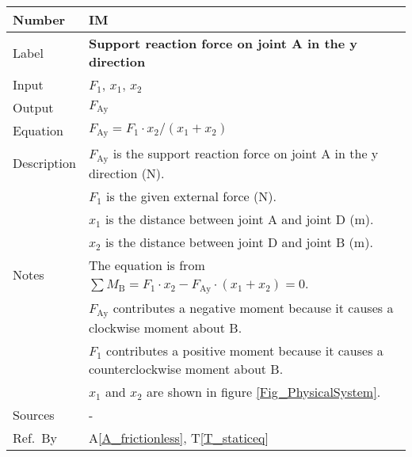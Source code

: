 \documentclass[12pt]{article}
\newcommand{\colAwidth}{0.13\textwidth}
\newcommand{\colBwidth}{0.82\textwidth}
\newcommand{\tref}[1]{T\ref{#1}}
\newcommand{\aref}[1]{A\ref{#1}}
\newcounter{instnum} %
\begin{document}
\noindent
\begin{minipage}{\textwidth}
	\renewcommand*{\arraystretch}{1.5}
	\begin{tabular}{| p{\colAwidth} | p{\colBwidth}|}
		\hline
		\rowcolor[gray]{0.9}
		Number& IM{instnum}\theinstnum \label{I_solveFay}\\
		\hline
		Label& \bf Support reaction force on joint A in the y direction\\
		\hline
		Input& $F_\text{1}$, $x_\text{1}$, $x_\text{2}$ \\
		\hline
		Output& $F_{\text{{Ay}}}$ \\
		\hline
		Equation& $F_{\text{Ay}} = F_\text{1} \cdot x_\text{2} / (x_\text{1} + 
		x_\text{2})$ \\
		\hline
		Description&$F_{\text{Ay}}$ is the support reaction force on joint A 
		in the y direction (N).\\
		&$F_1$ is the given external force (N).\\
		&$x_1$ is the distance between joint A and joint D (m).\\
		&$x_2$ is the distance between joint D and joint B (m).\\
		\hline
		Notes& The equation is from $\sum M_{\text{B}} = F_\text{1} \cdot 
		x_\text{2} - F_{\text{Ay}} \cdot (x_\text{1} + x_\text{2}) = 0$. \\
		&$F_{\text{Ay}}$ contributes a negative moment because it causes a 
		clockwise moment about B. \\
		&$F_1$ contributes a positive moment because it causes a 
		counterclockwise moment about B.\\
		&$x_1$ and $x_2$ are shown in figure \ref{Fig_PhysicalSystem}.\\
		\hline
		Sources& - \\
		\hline
		Ref.\ By & \aref{A_frictionless}, \tref{T_staticeq} \\
		\hline
	\end{tabular}
\end{minipage}\\

~\newline
\end{document}
